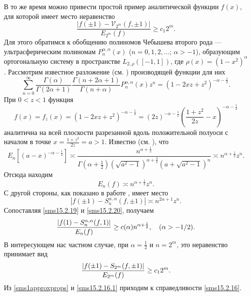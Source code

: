 В то же время можно привести простой пример аналитической функции $f(x)$, для которой имеет место неравенство
\begin{equation}
\label{sms15.2.16}
\frac{|f(\pm1)-\mathcal{V}_{2^m}(f, \pm1)|}{ E_{2^m}(f)}\ge
c_1 2^m.
\end{equation}
Для этого обратимся к обобщению полиномов Чебышева второго рода --- ультрасферическим полиномам $P_n^{\alpha, \alpha}(x)$ ($n =0,1,2,\ldots$; $\alpha > -1$), образующим ортогональную систему в пространстве $L_{2, \rho}([-1,1])$, где $\rho(x)=(1-x^2)^{\alpha}$.
Рассмотрим известное разложение (см. \cite{Haar-Tcheb-Sege})
производящей функции для них
\begin{equation}
\label{sms15.2.17}
\sum_{n=0}^\infty\frac{\Gamma(\alpha)}{\Gamma(2\alpha+1)}\frac{
     \Gamma(n+2\alpha+1)}{\Gamma(n+\alpha)}P_n^{\alpha,\alpha}(x)
     z^n=(1-2xz+z^2)^{-\alpha-\frac12}.
\end{equation}
При $0<z<1$ функция
\begin{equation}
\label{sms15.2.18}
f(x)=f_z(x)=(1-2xz+z^2)^{-\alpha-\frac12}=(2z)^{-\alpha-\frac12}
     \left({\frac{1+z^2}{2z}}-x\right)^{-\alpha-\frac12}
\end{equation}
аналитична  на всей плоскости  разрезанной вдоль положительной полуоси с началом в точке $x=\frac{1+z^2}{2z}=a>1$. Известно (см. \cite{sob-jac-discrete-Timan}),
что
\begin{equation}
 E_n[(a-x)^{-\alpha-\frac12}]\asymp \frac{n^{\alpha+\frac12}}{
\Gamma\left(\alpha+\frac12\right)(\sqrt{a^2-1})^{\alpha+\frac32}(a+\sqrt{a^2-1})^n}
     \asymp n^{\alpha+\frac12}z^n.
\end{equation}
Отсюда находим
\begin{equation}
\label{sms15.2.19}
E_n(f)\asymp n^{\alpha+\frac12}z^n.
\end{equation}
С другой стороны, как показано в работе \cite{sob-leg-sharap2},
имеет место
\begin{equation}
\label{sms15.2.20}
|f(\pm1)- S_n^{\alpha,\alpha}(f,\pm1)| \asymp n^{2\alpha+1}z^n.
\end{equation}
Сопоставляя \eqref{sms15.2.19} и \eqref{sms15.2.20}, получаем
\begin{equation*}
\label{sms15.2.21}
{|f(1)-S_n^{\alpha,\alpha}(f, 1)|\over E_n(f)}\ge
c(\alpha)n^{\alpha+\frac12}, \quad (\alpha>-1/2).
\end{equation*}
В интересующем нас частном случае, при $\alpha=\frac12$ и $n = 2^m$, это неравенство принимает вид
\begin{equation}
\label{sms15.2.16.1}
{|f(\pm1)-S_{2^m}(f, \pm1)|\over E_{2^m}(f)} \ge c_1 2^m.
\end{equation}
Из \eqref{sms1approxprops} и \eqref{sms15.2.16.1} приходим к справедливости \eqref{sms15.2.16}.


